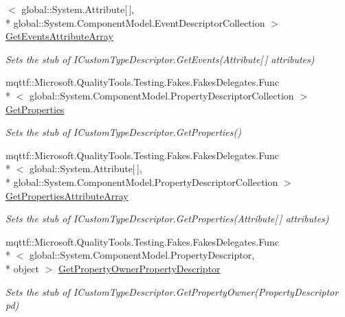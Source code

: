\begin{DoxyCompactItemize}
$<$ global\-::\-System.\-Attribute\mbox{[}$\,$\mbox{]}, \\*
global\-::\-System.\-Component\-Model.\-Event\-Descriptor\-Collection $>$ \hyperlink{class_system_1_1_component_model_1_1_fakes_1_1_stub_i_custom_type_descriptor_a4ffb5661e9de3c532bec965d502d5bbf}{Get\-Events\-Attribute\-Array}
\begin{DoxyCompactList}\small\item\em Sets the stub of I\-Custom\-Type\-Descriptor.\-Get\-Events(\-Attribute\mbox{[}$\,$\mbox{]} attributes)\end{DoxyCompactList}\item 
mqttf\-::\-Microsoft.\-Quality\-Tools.\-Testing.\-Fakes.\-Fakes\-Delegates.\-Func\\*
$<$ global\-::\-System.\-Component\-Model.\-Property\-Descriptor\-Collection $>$ \hyperlink{class_system_1_1_component_model_1_1_fakes_1_1_stub_i_custom_type_descriptor_abf769957183547cd50457f59e29e7d40}{Get\-Properties}
\begin{DoxyCompactList}\small\item\em Sets the stub of I\-Custom\-Type\-Descriptor.\-Get\-Properties()\end{DoxyCompactList}\item 
mqttf\-::\-Microsoft.\-Quality\-Tools.\-Testing.\-Fakes.\-Fakes\-Delegates.\-Func\\*
$<$ global\-::\-System.\-Attribute\mbox{[}$\,$\mbox{]}, \\*
global\-::\-System.\-Component\-Model.\-Property\-Descriptor\-Collection $>$ \hyperlink{class_system_1_1_component_model_1_1_fakes_1_1_stub_i_custom_type_descriptor_acf25b87792cbf18900d50ddbf358f045}{Get\-Properties\-Attribute\-Array}
\begin{DoxyCompactList}\small\item\em Sets the stub of I\-Custom\-Type\-Descriptor.\-Get\-Properties(\-Attribute\mbox{[}$\,$\mbox{]} attributes)\end{DoxyCompactList}\item 
mqttf\-::\-Microsoft.\-Quality\-Tools.\-Testing.\-Fakes.\-Fakes\-Delegates.\-Func\\*
$<$ global\-::\-System.\-Component\-Model.\-Property\-Descriptor, \\*
object $>$ \hyperlink{class_system_1_1_component_model_1_1_fakes_1_1_stub_i_custom_type_descriptor_a9ca9e7b59c1e77bc668daea764917480}{Get\-Property\-Owner\-Property\-Descriptor}
\begin{DoxyCompactList}\small\item\em Sets the stub of I\-Custom\-Type\-Descriptor.\-Get\-Property\-Owner(\-Property\-Descriptor pd)\end{DoxyCompactList}\end{DoxyCompactItemize}


